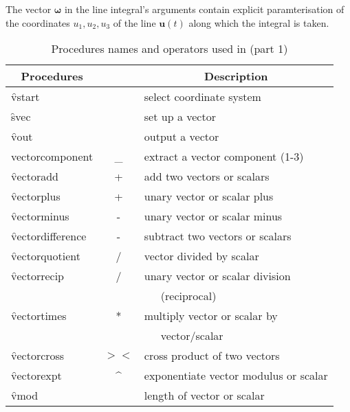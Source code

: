 The vector $\mathbf{\omega}$ in the line integral's arguments contain
explicit paramterisation of the coordinates $u_1, u_2, u_3$ of the
line $\mathbf{u}(t)$ along which the integral is taken.

\begin{table}
\begin{center}
\begin{tabular}{|l c l|} \hline
\multicolumn{1}{|c}{Procedures} & & \multicolumn{1}{c|}{Description} \\ \hline
  \f{vstart} & & select coordinate system \\[\baselineskip]
  \f{svec} & & set up a vector \\
  \f{vout} & & output a vector \\
\f{ vectorcomponent} & \_ & extract a vector component (1-3) \\[\baselineskip]
\f{vectoradd} & + & add two vectors or scalars \\
\f{vectorplus} & + & unary vector or scalar plus\\
\f{vectorminus} & - & unary vector or scalar minus\\
\f{vectordifference} & - & subtract two vectors or scalars \\
\f{vectorquotient} & / & vector divided by scalar \\
\f{vectorrecip} & / & unary vector or scalar division \\ & & \ \ \ (reciprocal)\\
\f{vectortimes} & * & multiply vector or scalar by \\ & & \ \ \ vector/scalar \\
\f{vectorcross} & $><$ & cross product of two vectors \\
\f{vectorexpt} & \textasciicircum{} & exponentiate vector modulus or scalar \\
\f{vmod} & & length of vector or scalar \\ \hline
\end{tabular}
\end{center}
\caption{Procedures names and operators used in  (part 1)}
\end{table}

